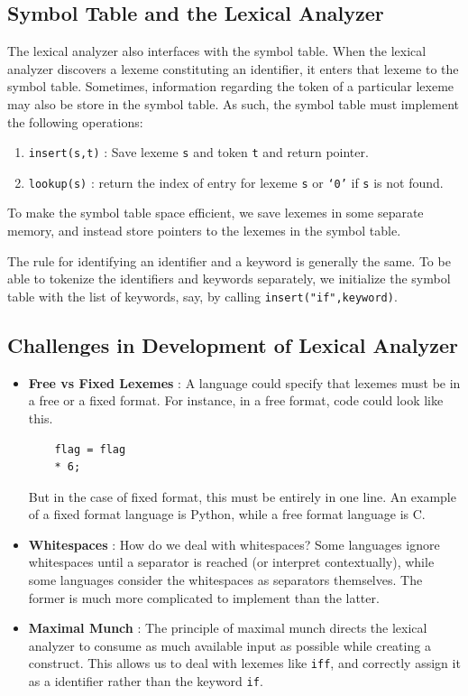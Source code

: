 \documentclass[12pt,letterpaper]{article}
\begin{document}
\subsection{Symbol Table and the Lexical Analyzer}

The lexical analyzer also interfaces with the symbol table. When the lexical analyzer discovers a lexeme constituting an identifier, it enters that lexeme to the symbol table. Sometimes, information regarding the token of a particular lexeme may also be store in the symbol table. As such, the symbol table must implement the following operations:

\begin{enumerate}
  \item \texttt{insert(s,t)} : Save lexeme \texttt{s} and token \texttt{t} and return pointer.
  \item \texttt{lookup(s)} : return the index of entry for lexeme \texttt{s} or \texttt{`0'} if \texttt{s} is not found.
\end{enumerate}

To make the symbol table space efficient, we save lexemes in some separate memory, and instead store pointers to the lexemes in the symbol table.

The rule for identifying an identifier and a keyword is generally the same. To be able to tokenize the identifiers and keywords separately, we initialize the symbol table with the list of keywords, say, by calling \texttt{insert("if",keyword)}.

\subsection{Challenges in Development of Lexical Analyzer}

\begin{itemize}
  \item \textbf{Free vs Fixed Lexemes} : A language could specify that lexemes must be in a free or a fixed format. For instance, in a free format, code could look like this.
    \begin{verbatim}
    flag = flag
    * 6;
    \end{verbatim}
    But in the case of fixed format, this must be entirely in one line. An example of a fixed format language is Python, while a free format language is C.
  \item \textbf{Whitespaces} : How do we deal with whitespaces? Some languages ignore whitespaces until a separator is reached (or interpret contextually), while some languages consider the whitespaces as separators themselves. The former is much more complicated to implement than the latter.
  \item \textbf{Maximal Munch} : The principle of maximal munch directs the lexical analyzer to consume as much available input as possible while creating a construct. This allows us to deal with lexemes like \texttt{iff}, and correctly assign it as a identifier rather than the keyword \texttt{if}.
\end{itemize}
\end{document}
